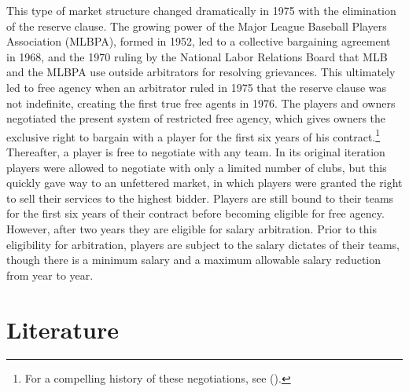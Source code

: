\documentclass[12pt]{article}
\newcommand{\citee}[1]{\citename{#1} (\citeyear{#1})}
\begin{document}
This type of market structure changed dramatically in 1975 with the elimination of the reserve clause.  The growing power of the Major League Baseball Players Association (MLBPA), formed in 1952, led to a collective bargaining agreement in 1968, and the 1970 ruling by the National Labor Relations Board that MLB and the MLBPA use outside arbitrators for resolving grievances.  This ultimately led to free agency when an arbitrator ruled in 1975 that the reserve clause was not indefinite, creating the first true free agents in 1976.  The players and owners negotiated the present system of restricted free agency, which gives owners the exclusive right to bargain with a player for the first six years of his contract.\footnote{For a compelling history of these negotiations, see \citee{miller1991}.}  Thereafter, a player is free to negotiate with any team.  In its original iteration players were allowed to negotiate with only a limited number of clubs, but this quickly gave way to an unfettered market, in which players were granted the right to sell their services to the highest bidder.  Players are still bound to their teams for the first six years of their contract before becoming eligible for free agency.  However, after two years they are eligible for salary arbitration.  Prior to this eligibility for arbitration, players are subject to the salary dictates of their teams, though there is a minimum salary and a maximum allowable salary reduction from year to year.

\section{Literature}\label{s:lit}
\end{document}
